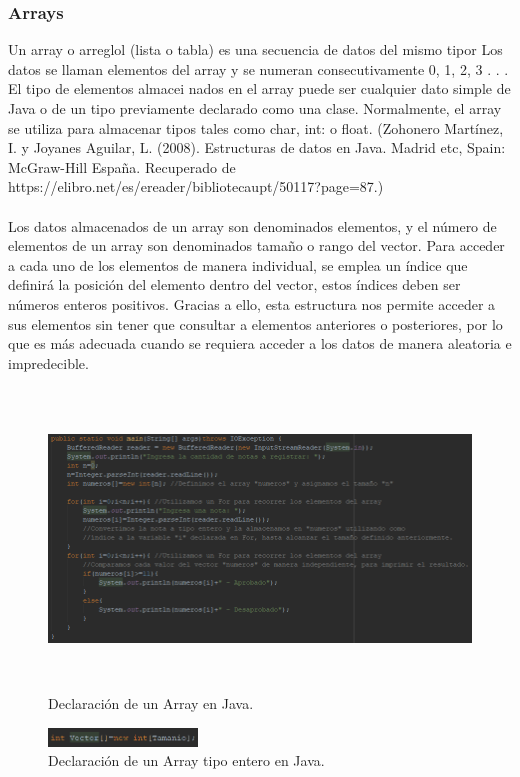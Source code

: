 \documentclass{article}
\begin{document}
\subsubsection{Arrays}
Un array o arreglol (lista o tabla) es una secuencia de datos del mismo tipor Los datos se llaman elementos del array y se numeran consecutivamente 0, 1, 2, 3 . . . El tipo de elementos almacei nados en el array puede ser cualquier dato simple de Java o de un tipo previamente declarado como una clase. Normalmente, el array se utiliza para almacenar tipos tales como char, int: o float. (Zohonero Martínez, I. y Joyanes Aguilar, L. (2008). Estructuras de datos en Java. Madrid etc, Spain: McGraw-Hill España. Recuperado de https://elibro.net/es/ereader/bibliotecaupt/50117?page=87.)\\\\Los datos almacenados de un array son denominados elementos, y el número de elementos de un array son denominados tamaño o rango del vector. Para acceder a cada uno de los elementos de manera individual, se emplea un índice que definirá la posición del elemento dentro del vector, estos índices deben ser números enteros positivos. Gracias a ello, esta estructura nos permite acceder a sus elementos sin tener que consultar a elementos anteriores o posteriores, por lo que es más adecuada cuando se requiera acceder a los datos de manera aleatoria e impredecible. 
\begin{figure}[ht]
    \centering     
    \includegraphics[height=8cm]{images/figura1.png}
    \caption{Declaración de un Array en Java.}
    \label{fig:BiasVoltage}
    
\end{figure}
\begin{figure}[ht]
    \centering     
    \includegraphics[height=0.5cm]{images/figura2.png}
    \caption{Declaración de un Array tipo entero en Java.}
    \label{fig:BiasVoltage}
    
\end{figure}
\end{document}
